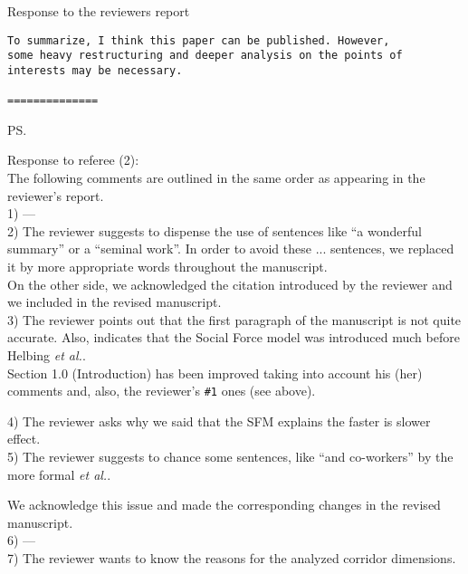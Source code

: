 \documentclass[a4paper,12pt]{letter}
\begin{document}
\begin{letter}{Response to the reviewers report}
\begin{verbatim}
To summarize, I think this paper can be published. However, 
some heavy restructuring and deeper analysis on the points of 
interests may be necessary. 

==============

\end{verbatim}


\ps{Response to referee (2): \\

The following comments are outlined in the same order as appearing in the
reviewer’s report. \\

1) ---\\

2) The reviewer suggests to dispense the use of sentences like ``a wonderful 
summary'' or a ``seminal work''. In order to avoid these ... sentences, we 
replaced it by more appropriate words throughout the manuscript. \\

On the other side, we acknowledged the citation introduced by the reviewer and 
we included in the revised manuscript. \\

3) The reviewer points out that the first paragraph of the manuscript is not 
quite accurate. Also, indicates that the Social Force model was introduced much 
before Helbing \textit{et al.}. \\

Section 1.0 (Introduction) has been improved taking into account his (her) 
comments and, also, the reviewer's \verb?#1? ones (see above). 


4) The reviewer asks why we said that the SFM explains the faster is 
slower effect. \\

5) The reviewer suggests to chance some sentences, like ``and co-workers'' by 
the more formal \textit{et al.}. 

We acknowledge this issue and made the corresponding changes in the
revised manuscript. \\

6) ---\\

7) The reviewer wants to know the reasons for the analyzed corridor dimensions. 
\\

}
\end{letter}
\end{document}
